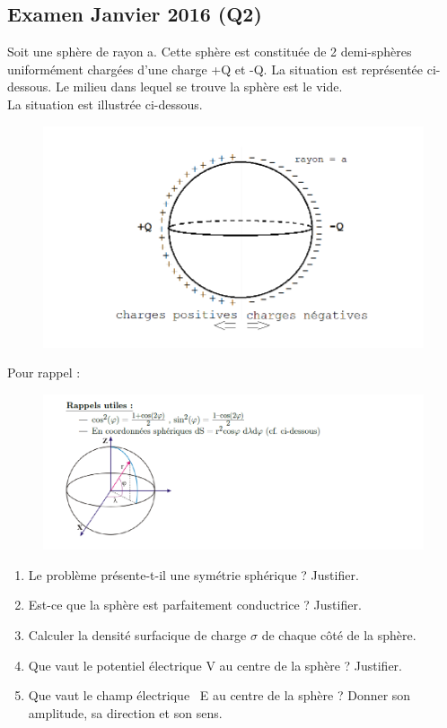 \subsection{Examen Janvier 2016 (Q2)}
Soit une sphère de rayon a. Cette sphère est constituée de 2 demi-sphères uniformément chargées d’une charge +Q et -Q. La situation est représentée ci-dessous. Le milieu dans lequel se trouve la sphère est le vide.\\
La situation est illustrée ci-dessous.
\begin{figure}[h!]
    \centering
    \includegraphics[width = 14cm]{TpQEx_Champs/Q2_TheoChampsJuin2016.PNG}
    \label{fig:Q2_TheoChampsJuin2016}
\end{figure}
Pour rappel :
\begin{figure}[h!]
    \centering
    \includegraphics[width = 18cm]{TpQEx_Champs/Q2_Hint_TheoChampsJuin2016.PNG}
    \label{fig:Q2_Hint_TheoChampsJuin2016}
\end{figure}

\begin{enumerate}
    \item Le problème présente-t-il une symétrie sphérique ? Justifier.
    \item Est-ce que la sphère est parfaitement conductrice ? Justifier.
    \item Calculer la densité surfacique de charge $\sigma$ de chaque côté de la sphère.
    \item Que vaut le potentiel électrique V au centre de la sphère ? Justifier.
    \item Que vaut le champ électrique ~E au centre de la sphère ? Donner son amplitude, sa direction et son sens.
\end{enumerate}

